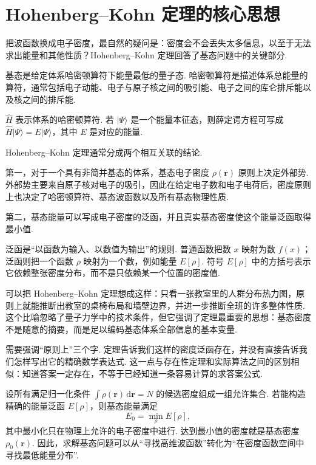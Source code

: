 \documentclass[UTF8,11pt,a4paper,openany]{ctexbook}
\newcommand{\ket}[1]{\lvert #1\rangle}\newcommand{\bra}[1]{\langle #1\rvert}
\newcommand{\dd}{\,\mathrm d}\newcommand{\Ham}{\hat H}\newcommand{\tr}{\operatorname{Tr}}
\begin{document}
\section{Hohenberg--Kohn 定理的核心思想}

把波函数换成电子密度，最自然的疑问是：密度会不会丢失太多信息，以至于无法求出能量和其他性质？Hohenberg--Kohn 定理回答了基态问题中的关键部分. 

\begin{definitionbox}
基态是给定体系哈密顿算符下能量最低的量子态. 哈密顿算符是描述体系总能量的算符，通常包括电子动能、电子与原子核之间的吸引能、电子之间的库仑排斥能以及核之间的排斥能. 
\end{definitionbox}

\begin{notationbox}
$\Ham$ 表示体系的哈密顿算符. 若 $\ket\Psi$ 是一个能量本征态，则薛定谔方程可写成 $\Ham\ket\Psi=E\ket\Psi$，其中 $E$ 是对应的能量. 
\end{notationbox}

Hohenberg--Kohn 定理通常分成两个相互关联的结论. 

第一，对于一个具有非简并基态的体系，基态电子密度 $\rho(\mathbf r)$ 原则上决定外部势. 外部势主要来自原子核对电子的吸引，因此在给定电子数和电子电荷后，密度原则上也决定了哈密顿算符、基态波函数以及所有基态物理性质. 

第二，基态能量可以写成电子密度的泛函，并且真实基态密度使这个能量泛函取得最小值. 

\begin{notationbox}
泛函是“以函数为输入、以数值为输出”的规则. 普通函数把数 $x$ 映射为数 $f(x)$；泛函则把一个函数 $\rho$ 映射为一个数，例如能量 $E[\rho]$. 符号 $E[\rho]$ 中的方括号表示它依赖整张密度分布，而不是只依赖某一个位置的密度值. 
\end{notationbox}

\begin{analogybox}
可以把 Hohenberg--Kohn 定理想成这样：只看一张教室里的人群分布热力图，原则上就能推断出教室的桌椅布局和墙壁边界，并进一步推断全班的许多整体性质. 这个比喻忽略了量子力学中的技术条件，但它强调了定理最重要的思想：基态密度不是随意的摘要，而是足以编码基态体系全部信息的基本变量. 
\end{analogybox}

需要强调“原则上”三个字. 定理告诉我们这样的密度泛函存在，并没有直接告诉我们怎样写出它的精确数学表达式. 这一点与存在性定理和实际算法之间的区别相似：知道答案一定存在，不等于已经知道一条容易计算的求答案公式. 

\begin{derivationbox}
设所有满足归一化条件 $\int\rho(\mathbf r)\dd\mathbf r=N$ 的候选密度组成一组允许集合. 若能构造精确的能量泛函 $E[\rho]$，则基态能量满足
\[
E_0=\min_{\rho}E[\rho],
\]
其中最小化只在物理上允许的电子密度中进行. 达到最小值的密度就是基态密度 $\rho_0(\mathbf r)$. 因此，求解基态问题可以从“寻找高维波函数”转化为“在密度函数空间中寻找最低能量分布”. 
\end{derivationbox}
\end{document}
